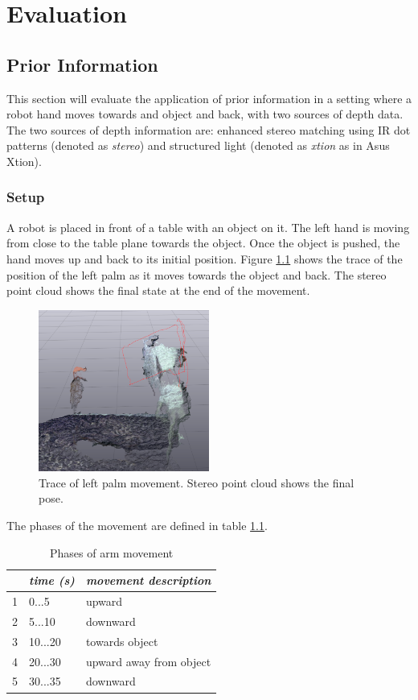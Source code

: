 \chapter{Evaluation}

\section{Prior Information}

This section will evaluate the application of prior information in a setting where a robot hand moves towards and object and back, with two sources of depth data. The two sources of depth information are: enhanced stereo matching using IR dot patterns (denoted as \emph{stereo}) and structured light (denoted as \emph{xtion} as in Asus Xtion).

\subsection{Setup}

A robot is placed in front of a table with an object on it. The left hand is moving from close to the table plane towards the object. Once the object is pushed, the hand moves up and back to its initial position. Figure \ref{fig:bottle_move_trace} shows the trace of the position of the left palm as it moves towards the object and back. The stereo point cloud shows the final state at the end of the movement.
%
\begin{figure}
\centering
\includegraphics[width=0.5\textwidth]{images/eval_prior/bottle_movement_trace.png}
\caption{Trace of left palm movement. Stereo point cloud shows the final pose.}
\label{fig:bottle_move_trace}
\end{figure}
%
The phases of the movement are defined in table \ref{tab:movement_phases}.

\begin{table}
\centering
\begin{tabular}{|c|l|l|}
\hline
 & \emph{time (s)} & \emph{movement description} \\
\hline
1 & 0...5 & upward \\
\hline
2 & 5...10 & downward \\
\hline
3 & 10...20 & towards object \\
\hline
4 & 20...30 & upward away from object \\
\hline
5 & 30...35 & downward \\
\hline
\end{tabular}
\caption{Phases of arm movement}
\label{tab:movement_phases}
\end{table}


